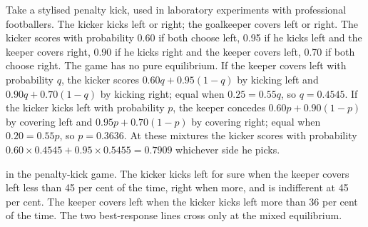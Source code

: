 Take a stylised penalty kick, used in laboratory experiments with professional footballers. The kicker
kicks left or right; the goalkeeper covers left or right. The kicker scores with probability 0.60 if both
choose left, 0.95 if he kicks left and the keeper covers right, 0.90 if he kicks right and the keeper covers
left, 0.70 if both choose right.
The game has no pure equilibrium. If the keeper covers left with probability $q$, the kicker scores $0.60q +
0.95(1 - q)$ by kicking left and $0.90q + 0.70(1 - q)$ by kicking right; equal when $0.25 = 0.55q$, so $q =
0.4545$. If the kicker kicks left with probability $p$, the keeper concedes $0.60p + 0.90(1 - p)$ by covering
left and $0.95p + 0.70(1 - p)$ by covering right; equal when $0.20 = 0.55p$, so $p = 0.3636$. At these mixtures the
kicker scores with probability $0.60 \times 0.4545 + 0.95 \times 0.5455 = 0.7909$ whichever side he picks.

\begin{omfigure}

{\small {} in the penalty-kick game. The kicker kicks left for sure when the keeper covers left
less than 45 per cent of the time, right when more, and is indifferent at 45 per cent. The keeper covers left
when the kicker kicks left more than 36 per cent of the time. The two best-response lines cross only at the
mixed equilibrium.}
\end{omfigure}

